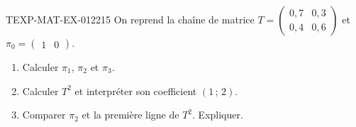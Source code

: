 \begin{exercice}{TEXP-MAT-EX-012}{2}{15}
On reprend la chaîne de matrice
$T=\begin{pmatrix}0{,}7&0{,}3\\0{,}4&0{,}6\end{pmatrix}$ et
$\pi_0=\begin{pmatrix}1&0\end{pmatrix}$.
\begin{enumerate}
  \item Calculer $\pi_1$, $\pi_2$ et $\pi_3$.
  \item Calculer $T^2$ et interpréter son coefficient $(1\,;\,2)$.
  \item Comparer $\pi_2$ et la première ligne de $T^2$. Expliquer.
\end{enumerate}
\end{exercice}
